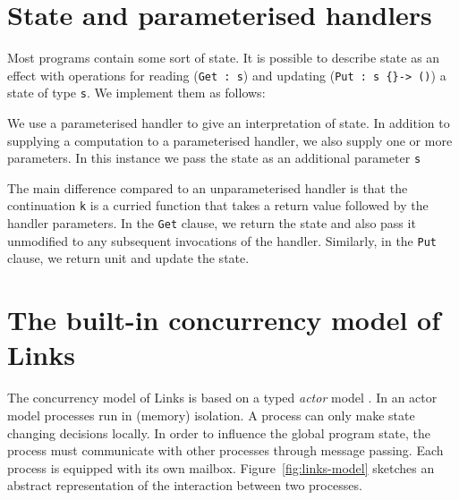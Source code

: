 \documentclass[12pt,mscres,cdtppar,twoside,openright,logo,rightchapter,normalheadings]{infthesis}
\theoremstyle{definition}
\newcommand{\todo}[1]{{\par\noindent\small\color{red} \framebox{\parbox{\dimexpr\linewidth-2\fboxsep-2\fboxrule}{\textbf{TODO:} #1}}}}
\begin{document}
\section{State and parameterised handlers}
\label{sec:parameterised-handlers}

Most programs contain some sort of state. It is possible to describe
state as an effect with operations for reading (\lstinline$Get : s$)
and updating (\lstinline$Put : s {}-> ()$) a state of type
\lstinline$s$. We implement them as follows:
%

%
We use a parameterised handler to give an interpretation of state.  In
addition to supplying a computation to a parameterised handler, we
also supply one or more parameters. In this instance we pass the state
as an additional parameter \lstinline$s$
%

%
The main difference compared to an unparameterised handler is that the
continuation \lstinline$k$ is a curried function that takes a return
value followed by the handler parameters. In the \lstinline$Get$
clause, we return the state and also pass it unmodified to any
subsequent invocations of the handler. Similarly, in the
\lstinline$Put$ clause, we return unit and update the state.

\todo{insert example}

\section{The built-in concurrency model of Links}
\label{sec:links-model}

The concurrency model of Links is based on a typed \emph{actor} model
\citet{Cooper2006}. In an actor model processes run in (memory)
isolation. A process can only make state changing decisions
locally. In order to influence the global program state, the process
must communicate with other processes through message passing. Each
process is equipped with its own mailbox. Figure~\ref{fig:links-model}
sketches an abstract representation of the interaction between two
processes.
\end{document}
